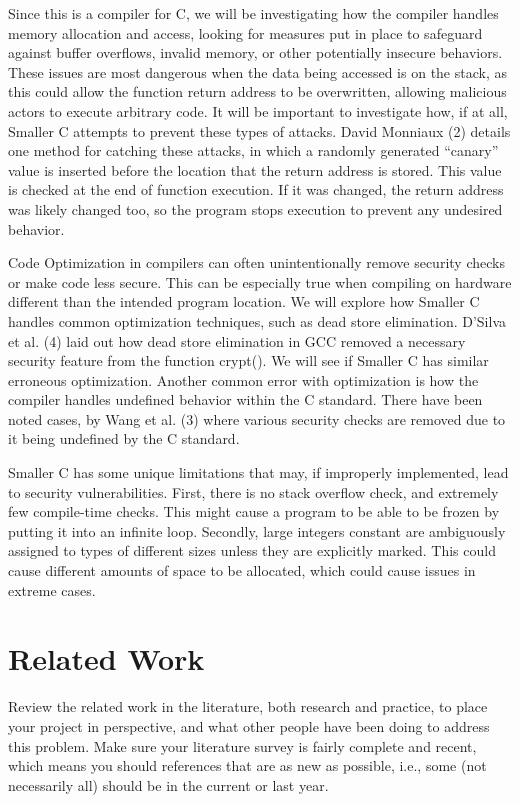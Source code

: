 \documentclass[sigconf, anonymous]{acmart}
\begin{document}
Since this is a compiler for C, we will be investigating how the compiler handles memory allocation and access, looking for measures put in place to safeguard against buffer overflows, invalid memory, or other potentially insecure behaviors. These issues are most dangerous when the data being accessed is on the stack, as this could allow the function return address to be overwritten, allowing malicious actors to execute arbitrary code. It will be important to investigate how, if at all, Smaller C attempts to prevent these types of attacks. David Monniaux (2) details one method for catching these attacks, in which a randomly generated “canary” value is inserted before the location that the return address is stored. This value is checked at the end of function execution. If it was changed, the return address was likely changed too, so the program stops execution to prevent any undesired behavior.

Code Optimization in compilers can often unintentionally remove security checks or make code less secure. This can be especially true when compiling on hardware different than the intended program location. We will explore how Smaller C handles common optimization techniques, such as dead store elimination. D’Silva et al. (4) laid out how dead store elimination in GCC removed a necessary security feature from the function crypt(). We will see if Smaller C has similar erroneous optimization. Another common error with optimization is how the compiler handles undefined behavior within the C standard. There have been noted cases, by Wang et al. (3) where various security checks are removed due to it being undefined by the C standard.


Smaller C has some unique limitations that may, if improperly implemented, lead to security vulnerabilities. First, there is no stack overflow check, and extremely few compile-time checks. This might cause a program to be able to be frozen by putting it into an infinite loop. Secondly, large integers constant are ambiguously assigned to types of different sizes unless they are explicitly marked. This could cause different amounts of space to be allocated, which could cause issues in extreme cases.

\section{Related Work}
\label{related work}

Review the related work in the literature, both research and practice,
to place your project in perspective, and what other people have been
doing to address this problem. Make sure your literature survey is
fairly complete and recent, which means you should references that are
as new as possible, i.e., some (not necessarily all) should be in the
current or last year.
\end{document}
